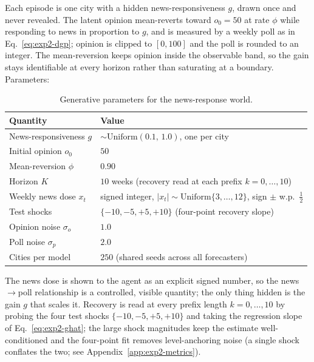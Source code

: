 \documentclass{article} %
\begin{document}
Each episode is one city with a hidden news-responsiveness $g$, drawn once and never
revealed.  The latent opinion mean-reverts toward $o_0=50$ at rate $\phi$ while responding to
news in proportion to $g$, and is measured by a weekly poll as in Eq.~\eqref{eq:exp2-dgp};
opinion is clipped to $[0,100]$ and the poll is rounded to an integer.  The mean-reversion keeps
opinion inside the observable band, so the gain stays identifiable at every horizon rather than
saturating at a boundary.  Parameters:

\begin{table}[h]
\centering
\caption{Generative parameters for the news-response world.}
\label{tab:exp2-params}
\small
\begin{tabular}{ll}
\toprule
\textbf{Quantity} & \textbf{Value} \\
\midrule
News-responsiveness $g$        & $\sim\mathrm{Uniform}(0.1,\,1.0)$, one per city \\
Initial opinion $o_0$          & $50$ \\
Mean-reversion $\phi$          & $0.90$ \\
Horizon $K$                    & $10$ weeks (recovery read at each prefix $k=0,\dots,10$) \\
Weekly news dose $x_t$         & signed integer, $|x_t|\sim\mathrm{Uniform}\{3,\dots,12\}$, sign $\pm$ w.p.\ $\tfrac12$ \\
Test shocks                    & $\{-10,-5,+5,+10\}$ (four-point recovery slope) \\
Opinion noise $\sigma_o$       & $1.0$ \\
Poll noise $\sigma_p$          & $2.0$ \\
Cities per model              & $250$ (shared seeds across all forecasters) \\
\bottomrule
\end{tabular}
\end{table}

The news dose is shown to the agent as an explicit signed number, so the
news$\rightarrow$poll relationship is a controlled, visible quantity; the only thing hidden
is the gain $g$ that scales it.  Recovery is read at every prefix length $k=0,\dots,10$ by probing
the four test shocks $\{-10,-5,+5,+10\}$ and taking the regression slope of
Eq.~\eqref{eq:exp2-ghat}; the large shock magnitudes keep the estimate well-conditioned and the
four-point fit removes level-anchoring noise (a single shock conflates the two; see
Appendix~\ref{app:exp2-metrics}).
\end{document}
